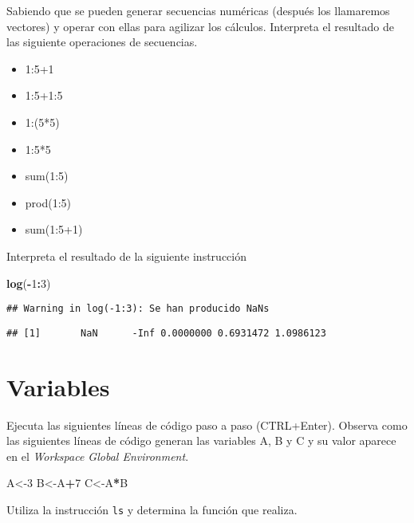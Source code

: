 \documentclass[
]{article}
\newenvironment{Shaded}{\begin{snugshade}}{\end{snugshade}}
\newcommand{\DecValTok}[1]{\textcolor[rgb]{0.00,0.00,0.81}{#1}}
\newcommand{\KeywordTok}[1]{\textcolor[rgb]{0.13,0.29,0.53}{\textbf{#1}}}
\newcommand{\NormalTok}[1]{#1}
\newcommand{\OperatorTok}[1]{\textcolor[rgb]{0.81,0.36,0.00}{\textbf{#1}}}
\providecommand{\tightlist}{%
  \setlength{\itemsep}{0pt}\setlength{\parskip}{0pt}}
\begin{document}
Sabiendo que se pueden generar secuencias numéricas (después los
llamaremos vectores) y operar con ellas para agilizar los cálculos.
Interpreta el resultado de las siguiente operaciones de secuencias.

\begin{itemize}
\tightlist
\item
  1:5+1
\item
  1:5+1:5
\item
  1:(5*5)
\item
  1:5*5
\item
  sum(1:5)
\item
  prod(1:5)
\item
  sum(1:5+1)
\end{itemize}

Interpreta el resultado de la siguiente instrucción

\begin{Shaded}
\begin{Highlighting}[]
\KeywordTok{log}\NormalTok{(}\OperatorTok{-}\DecValTok{1}\OperatorTok{:}\DecValTok{3}\NormalTok{) }
\end{Highlighting}
\end{Shaded}

\begin{verbatim}
## Warning in log(-1:3): Se han producido NaNs
\end{verbatim}

\begin{verbatim}
## [1]       NaN      -Inf 0.0000000 0.6931472 1.0986123
\end{verbatim}

\hypertarget{variables}{%
\section{Variables}\label{variables}}

Ejecuta las siguientes líneas de código paso a paso (CTRL+Enter).
Observa como las siguientes líneas de código generan las variables A, B
y C y su valor aparece en el \emph{Workspace Global Environment}.

\begin{Shaded}
\begin{Highlighting}[]
\NormalTok{A<-}\DecValTok{3}
\NormalTok{B<-A}\OperatorTok{+}\DecValTok{7}
\NormalTok{C<-A}\OperatorTok{*}\NormalTok{B}
\end{Highlighting}
\end{Shaded}

Utiliza la instrucción \texttt{ls} y determina la función que realiza.
\end{document}
